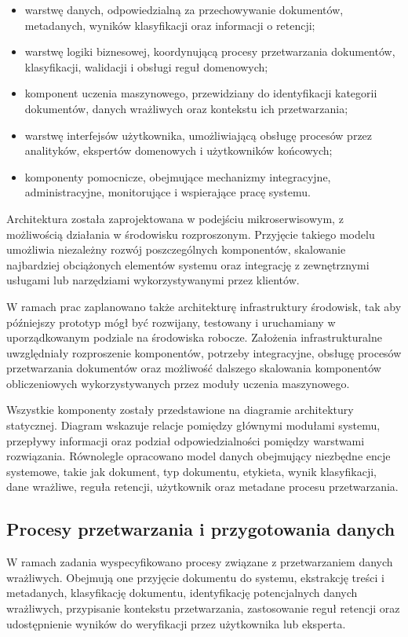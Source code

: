 \documentclass[12pt,a4paper]{report}
\begin{document}
\begin{itemize}
    \item warstwę danych, odpowiedzialną za przechowywanie dokumentów, metadanych, wyników klasyfikacji oraz informacji o retencji;
    \item warstwę logiki biznesowej, koordynującą procesy przetwarzania dokumentów, klasyfikacji, walidacji i obsługi reguł domenowych;
    \item komponent uczenia maszynowego, przewidziany do identyfikacji kategorii dokumentów, danych wrażliwych oraz kontekstu ich przetwarzania;
    \item warstwę interfejsów użytkownika, umożliwiającą obsługę procesów przez analityków, ekspertów domenowych i użytkowników końcowych;
    \item komponenty pomocnicze, obejmujące mechanizmy integracyjne, administracyjne, monitorujące i wspierające pracę systemu.
\end{itemize}

Architektura została zaprojektowana w podejściu mikroserwisowym, z możliwością działania w środowisku rozproszonym. Przyjęcie takiego modelu umożliwia niezależny rozwój poszczególnych komponentów, skalowanie najbardziej obciążonych elementów systemu oraz integrację z zewnętrznymi usługami lub narzędziami wykorzystywanymi przez klientów.

W ramach prac zaplanowano także architekturę infrastruktury środowisk, tak aby późniejszy prototyp mógł być rozwijany, testowany i uruchamiany w uporządkowanym podziale na środowiska robocze. Założenia infrastrukturalne uwzględniały rozproszenie komponentów, potrzeby integracyjne, obsługę procesów przetwarzania dokumentów oraz możliwość dalszego skalowania komponentów obliczeniowych wykorzystywanych przez moduły uczenia maszynowego.

Wszystkie komponenty zostały przedstawione na diagramie architektury statycznej. Diagram wskazuje relacje pomiędzy głównymi modułami systemu, przepływy informacji oraz podział odpowiedzialności pomiędzy warstwami rozwiązania. Równolegle opracowano model danych obejmujący niezbędne encje systemowe, takie jak dokument, typ dokumentu, etykieta, wynik klasyfikacji, dane wrażliwe, reguła retencji, użytkownik oraz metadane procesu przetwarzania.

\subsection{Procesy przetwarzania i przygotowania danych}
W ramach zadania wyspecyfikowano procesy związane z przetwarzaniem danych wrażliwych. Obejmują one przyjęcie dokumentu do systemu, ekstrakcję treści i metadanych, klasyfikację dokumentu, identyfikację potencjalnych danych wrażliwych, przypisanie kontekstu przetwarzania, zastosowanie reguł retencji oraz udostępnienie wyników do weryfikacji przez użytkownika lub eksperta.
\end{document}
